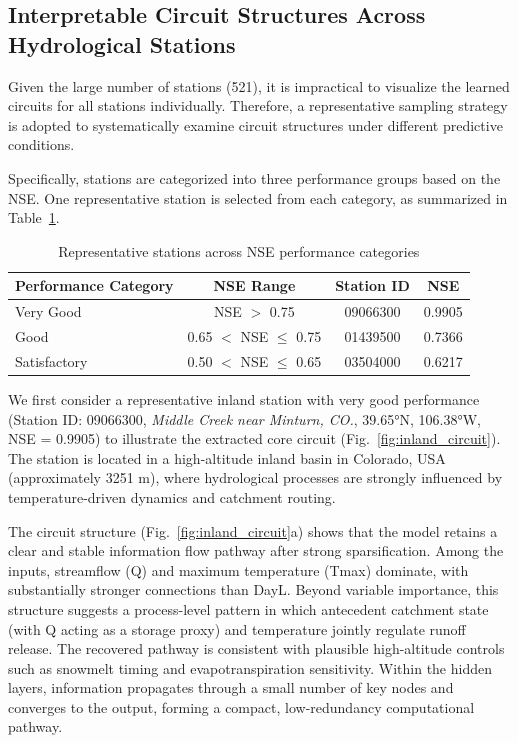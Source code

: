 \FloatBarrier

\subsection{Interpretable Circuit Structures Across Hydrological Stations}
Given the large number of stations (521), it is impractical to visualize the learned circuits for all stations individually. Therefore, a representative sampling strategy is adopted to systematically examine circuit structures under different predictive conditions.

Specifically, stations are categorized into three performance groups\cite{Nse} based on the NSE. One representative station is selected from each category, as summarized in Table~\ref{tab:nse_categories}.

\begin{table}[htbp]
    \centering
    \caption{Representative stations across NSE performance categories}
    \label{tab:nse_categories}
    \begin{tabular*}{\textwidth}{@{\extracolsep{\fill}}lccc}
        \toprule
        Performance Category & NSE Range & Station ID & NSE \\
        \midrule
        Very Good     & NSE $>$ 0.75              & 09066300 & 0.9905 \\
        Good          & 0.65 $<$ NSE $\leq$ 0.75 & 01439500 & 0.7366 \\
        Satisfactory  & 0.50 $<$ NSE $\leq$ 0.65 & 03504000 & 0.6217 \\
        \bottomrule
    \end{tabular*}
\end{table}

We first consider a representative inland station with very good performance (Station ID: 09066300, \textit{Middle Creek near Minturn, CO.}, 39.65°N, 106.38°W, NSE = 0.9905) to illustrate the extracted core circuit (Fig.~\ref{fig:inland_circuit}). The station is located in a high-altitude inland basin in Colorado, USA (approximately 3251 m), where hydrological processes are strongly influenced by temperature-driven dynamics and catchment routing\cite{Biemans2019}.

The circuit structure (Fig.~\ref{fig:inland_circuit}a) shows that the model retains a clear and stable information flow pathway after strong sparsification. Among the inputs, streamflow (Q) and maximum temperature (Tmax) dominate, with substantially stronger connections than DayL. Beyond variable importance, this structure suggests a process-level pattern in which antecedent catchment state (with Q acting as a storage proxy) and temperature jointly regulate runoff release. The recovered pathway is consistent with plausible high-altitude controls such as snowmelt timing and evapotranspiration sensitivity\cite{openai_weight_sparse_transformers}. Within the hidden layers, information propagates through a small number of key nodes and converges to the output, forming a compact, low-redundancy computational pathway.

